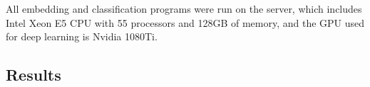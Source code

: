 All embedding and classification programs were run on the server, which includes Intel Xeon E5 CPU with 55 processors and 128GB of memory, and the GPU used for deep learning is Nvidia 1080Ti.

\subsection{Results}



